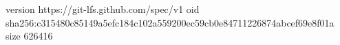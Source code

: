 version https://git-lfs.github.com/spec/v1
oid sha256:c315480c85149a5efc184c102a559200ec59cb0e84711226874abcef69e8f01a
size 626416
